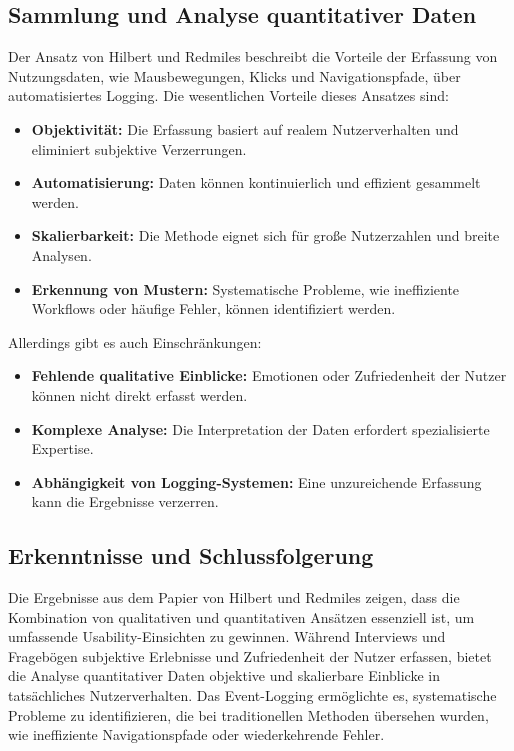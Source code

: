 \documentclass[12pt,oneside]{article}
\begin{document}
\subsection{Sammlung und Analyse quantitativer Daten}
Der Ansatz von Hilbert und Redmiles \cite{Hilbert2000} beschreibt die Vorteile der Erfassung von Nutzungsdaten, wie Mausbewegungen, Klicks und Navigationspfade, über automatisiertes Logging. Die wesentlichen Vorteile dieses Ansatzes sind:
\begin{itemize}
    \item \textbf{Objektivität:} Die Erfassung basiert auf realem Nutzerverhalten und eliminiert subjektive Verzerrungen.
    \item \textbf{Automatisierung:} Daten können kontinuierlich und effizient gesammelt werden.
    \item \textbf{Skalierbarkeit:} Die Methode eignet sich für große Nutzerzahlen und breite Analysen.
    \item \textbf{Erkennung von Mustern:} Systematische Probleme, wie ineffiziente Workflows oder häufige Fehler, können identifiziert werden.
\end{itemize}
Allerdings gibt es auch Einschränkungen:
\begin{itemize}
    \item \textbf{Fehlende qualitative Einblicke:} Emotionen oder Zufriedenheit der Nutzer können nicht direkt erfasst werden.
    \item \textbf{Komplexe Analyse:} Die Interpretation der Daten erfordert spezialisierte Expertise.
    \item \textbf{Abhängigkeit von Logging-Systemen:} Eine unzureichende Erfassung kann die Ergebnisse verzerren.
\end{itemize}

\subsection{Erkenntnisse und Schlussfolgerung}
Die Ergebnisse aus dem Papier von Hilbert und Redmiles \cite{Hilbert2000} zeigen, dass die Kombination von qualitativen und quantitativen Ansätzen essenziell ist, um umfassende Usability-Einsichten zu gewinnen. Während Interviews und Fragebögen subjektive Erlebnisse und Zufriedenheit der Nutzer erfassen, bietet die Analyse quantitativer Daten objektive und skalierbare Einblicke in tatsächliches Nutzerverhalten. Das Event-Logging ermöglichte es, systematische Probleme zu identifizieren, die bei traditionellen Methoden übersehen wurden, wie ineffiziente Navigationspfade oder wiederkehrende Fehler.
\end{document}
